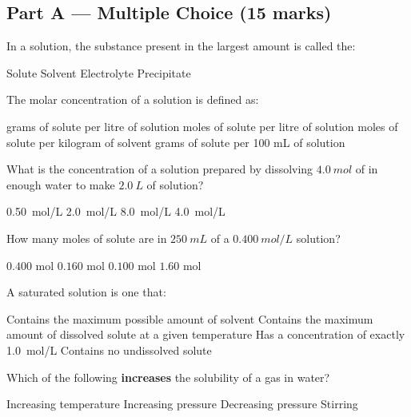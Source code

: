 \documentclass[addpoints]{exam}
\begin{document}
\newpage
\begin{questions}

\section*{Part A --- Multiple Choice (15 marks)}
\vspace{5mm}

\question[1] In a solution, the substance present in the largest amount is called the:
\begin{choices}
    \choice Solute
    \correctchoice Solvent
    \choice Electrolyte
    \choice Precipitate
\end{choices}

\question[1] The molar concentration of a solution is defined as:
\begin{choices}
    \choice grams of solute per litre of solution
    \correctchoice moles of solute per litre of solution
    \choice moles of solute per kilogram of solvent
    \choice grams of solute per 100 mL of solution
\end{choices}

\question[1] What is the concentration of a solution prepared by dissolving $\SI{4.0}{mol}$
of  in enough water to make $\SI{2.0}{L}$ of solution?
\begin{choices}
    \choice \SI{0.50}{mol/L}
    \correctchoice \SI{2.0}{mol/L}
    \choice \SI{8.0}{mol/L}
    \choice \SI{4.0}{mol/L}
\end{choices}

\question[1] How many moles of solute are in $\SI{250}{mL}$ of a $\SI{0.400}{mol/L}$
solution?
\begin{choices}
    \choice $0.400$ mol
    \choice $0.160$ mol
    \correctchoice $0.100$ mol
    \choice $1.60$ mol
\end{choices}

\question[1] A saturated solution is one that:
\begin{choices}
    \choice Contains the maximum possible amount of solvent
    \correctchoice Contains the maximum amount of dissolved solute at a given temperature
    \choice Has a concentration of exactly \SI{1.0}{mol/L}
    \choice Contains no undissolved solute
\end{choices}

\question[1] Which of the following \textbf{increases} the solubility of a gas in water?
\begin{choices}
    \choice Increasing temperature
    \correctchoice Increasing pressure
    \choice Decreasing pressure
    \choice Stirring
\end{choices}


\end{questions}
\end{document}
